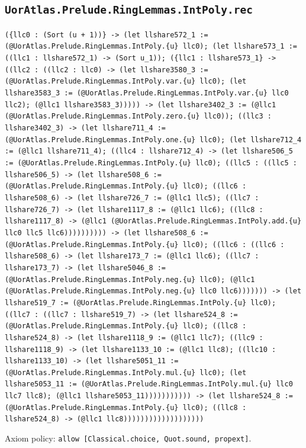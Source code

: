 \documentclass[11pt]{article}
\begin{document}
\subsection*{\texttt{UorAtlas.Prelude.RingLemmas.IntPoly.rec}}
\noindent\texttt{(\{llc0 : (Sort (u + 1))\} -> (let llshare572\_1 := (@UorAtlas.Prelude.RingLemmas.IntPoly.\{u\} llc0); (let llshare573\_1 := ((llc1 : llshare572\_1) -> (Sort u\_1)); (\{llc1 : llshare573\_1\} -> ((llc2 : ((llc2 : llc0) -> (let llshare3580\_3 := (@UorAtlas.Prelude.RingLemmas.IntPoly.var.\{u\} llc0); (let llshare3583\_3 := (@UorAtlas.Prelude.RingLemmas.IntPoly.var.\{u\} llc0 llc2); (@llc1 llshare3583\_3))))) -> (let llshare3402\_3 := (@llc1 (@UorAtlas.Prelude.RingLemmas.IntPoly.zero.\{u\} llc0)); ((llc3 : llshare3402\_3) -> (let llshare711\_4 := (@UorAtlas.Prelude.RingLemmas.IntPoly.one.\{u\} llc0); (let llshare712\_4 := (@llc1 llshare711\_4); ((llc4 : llshare712\_4) -> (let llshare506\_5 := (@UorAtlas.Prelude.RingLemmas.IntPoly.\{u\} llc0); ((llc5 : ((llc5 : llshare506\_5) -> (let llshare508\_6 := (@UorAtlas.Prelude.RingLemmas.IntPoly.\{u\} llc0); ((llc6 : llshare508\_6) -> (let llshare726\_7 := (@llc1 llc5); ((llc7 : llshare726\_7) -> (let llshare1117\_8 := (@llc1 llc6); ((llc8 : llshare1117\_8) -> (@llc1 (@UorAtlas.Prelude.RingLemmas.IntPoly.add.\{u\} llc0 llc5 llc6)))))))))) -> (let llshare508\_6 := (@UorAtlas.Prelude.RingLemmas.IntPoly.\{u\} llc0); ((llc6 : ((llc6 : llshare508\_6) -> (let llshare173\_7 := (@llc1 llc6); ((llc7 : llshare173\_7) -> (let llshare5046\_8 := (@UorAtlas.Prelude.RingLemmas.IntPoly.neg.\{u\} llc0); (@llc1 (@UorAtlas.Prelude.RingLemmas.IntPoly.neg.\{u\} llc0 llc6))))))) -> (let llshare519\_7 := (@UorAtlas.Prelude.RingLemmas.IntPoly.\{u\} llc0); ((llc7 : ((llc7 : llshare519\_7) -> (let llshare524\_8 := (@UorAtlas.Prelude.RingLemmas.IntPoly.\{u\} llc0); ((llc8 : llshare524\_8) -> (let llshare1118\_9 := (@llc1 llc7); ((llc9 : llshare1118\_9) -> (let llshare1133\_10 := (@llc1 llc8); ((llc10 : llshare1133\_10) -> (let llshare5051\_11 := (@UorAtlas.Prelude.RingLemmas.IntPoly.mul.\{u\} llc0); (let llshare5053\_11 := (@UorAtlas.Prelude.RingLemmas.IntPoly.mul.\{u\} llc0 llc7 llc8); (@llc1 llshare5053\_11))))))))))) -> (let llshare524\_8 := (@UorAtlas.Prelude.RingLemmas.IntPoly.\{u\} llc0); ((llc8 : llshare524\_8) -> (@llc1 llc8)))))))))))))))))))}\par
\noindent Axiom policy: \texttt{allow [Classical.choice, Quot.sound, propext]}.\par
\end{document}
